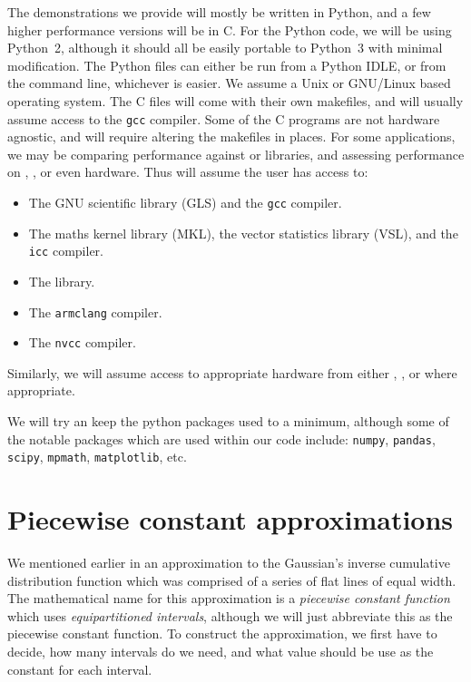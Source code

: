 \documentclass[11pt,a4paper,oneside,english]{extarticle}
\begin{document}
The demonstrations we provide will mostly be written in Python, and a few higher performance versions will be in C. For the Python code, we will be using Python~2, although it should all be easily portable to Python~3 with minimal modification. The Python files can either be run from a Python IDLE, or from the command line, whichever is easier. We assume a Unix or GNU/Linux based operating system. The C files will come with their own makefiles, and will usually assume access to the \texttt{gcc} compiler. Some of the C programs are not hardware agnostic, and will require altering the makefiles in places. For some applications, we may be comparing performance against \intel or \nag libraries, and assessing performance on \intel, \arm, or even \nvidia hardware. Thus will assume the user has access to:
\begin{itemize}
\item The GNU scientific library (GLS) and the \texttt{gcc} compiler.
\item The \intel maths kernel library (MKL), the vector statistics library (VSL), and the \texttt{icc} compiler. 
\item The \nag library. 
\item The \arm \texttt{armclang} compiler.
\item The \nvidia \texttt{nvcc} compiler.
\end{itemize} 
Similarly, we will assume access to appropriate hardware from either \intel, \arm, or \nvidia where appropriate. 

We will try an keep the python packages used to a minimum, although some of the notable packages which are used within our code include: \texttt{numpy}, \texttt{pandas}, \texttt{scipy}, \texttt{mpmath}, \texttt{matplotlib}, etc. 

\section{Piecewise constant approximations}

We mentioned earlier in  an approximation to the Gaussian's inverse cumulative distribution function which was comprised of a series of flat lines of equal width. The mathematical name for this approximation is a \emph{piecewise constant function} which uses \emph{equipartitioned intervals}, although we will just abbreviate this as the piecewise constant function. To construct the approximation, we first have to decide, how many intervals do we need, and what value should be use as the constant for each interval. 
\end{document}
